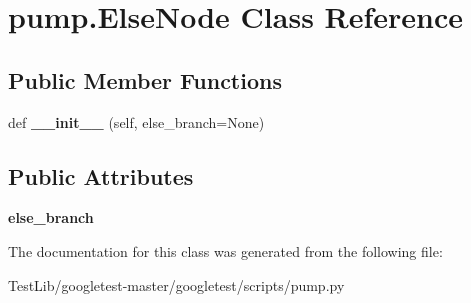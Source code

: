 \hypertarget{classpump_1_1ElseNode}{}\section{pump.\+Else\+Node Class Reference}
\label{classpump_1_1ElseNode}
\subsection*{Public Member Functions}
\begin{DoxyCompactItemize}
\item 
\mbox{\label{classpump_1_1ElseNode_a7489ff8c6c7ddfe6bd6593b8ecccd819}} 
def {\bfseries \+\_\+\+\_\+init\+\_\+\+\_\+} (self, else\+\_\+branch=None)
\end{DoxyCompactItemize}
\subsection*{Public Attributes}
\begin{DoxyCompactItemize}
\item 
\mbox{\label{classpump_1_1ElseNode_ac838a0fe9f5d713c7f56939eed5e128d}} 
{\bfseries else\+\_\+branch}
\end{DoxyCompactItemize}


The documentation for this class was generated from the following file\+:\begin{DoxyCompactItemize}
\item 
Test\+Lib/googletest-\/master/googletest/scripts/pump.\+py\end{DoxyCompactItemize}
